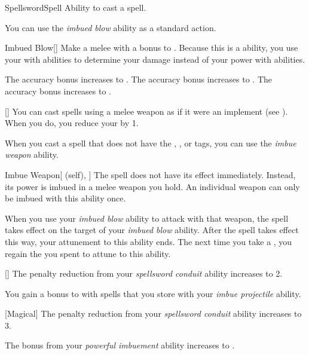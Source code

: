     \begin{feat}{Spellsword}{Spell}
        \featpre Ability to cast a spell.

         You can use the \textit{imbued blow} ability as a standard action.
        \begin{freeability}{Imbued Blow}[]
            Make a melee  with a  bonus to .
            Because this is a  ability, you use your  with  abilities to determine your damage instead of your power with  abilities.

            \rankline
             The accuracy bonus increases to .
             The accuracy bonus increases to .
             The accuracy bonus increases to .
        \end{freeability}

        [] You can cast spells using a melee weapon as if it were an implement (see ).
        When you do, you reduce your  by 1.

         When you cast a spell that does not have the , , or  tags,
            you can use the \textit{imbue weapon} ability.
        \begin{attuneability}{Imbue Weapon}[ (self), ]
            The spell does not have its effect immediately.
            Instead, its power is imbued in a melee weapon you hold.
            An individual weapon can only be imbued with this ability once.

            When you use your \textit{imbued blow} ability to attack with that weapon, the spell takes effect on the target of your \textit{imbued blow} ability.
            After the spell takes effect this way, your attunement to this ability ends.
            The next time you take a , you regain the  you spent to attune to this ability.
        \end{attuneability}

        [] The penalty reduction from your \textit{spellsword conduit} ability increases to 2.

         You gain a  bonus to  with spells that you store with your \textit{imbue projectile} ability.

        [Magical] The penalty reduction from your \textit{spellsword conduit} ability increases to 3.

         The bonus from your \textit{powerful imbuement} ability increases to .
    \end{feat}

